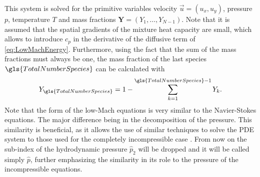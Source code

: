 This system is solved for the primitive variables velocity $\vec{u} = (u_x, u_y)$, pressure $p$, temperature $T$ and mass fractions ${\mathbf{Y} = (Y_1,\dots,Y_{N-1})}$. Note that it is assumed that the spatial gradients of the mixture heat capacity are small, which allows to introduce $c_p$ in the derivative of the diffusive term of \cref{eq:LowMachEnergy}. Furthermore, using the fact that the sum of the mass fractions must always be one, the mass fraction of the last species $\gls{TotalNumberSpecies}$ can be calculated with
\begin{align} \label{eq:MassFractionConstraint}
	Y_{\gls{TotalNumberSpecies}} = 1 - \sum_{k = 1}^{\gls{TotalNumberSpecies}-1}Y_k.
\end{align}
Note that the form of the low-Mach equations is very similar to the Navier-Stokes equations. The major difference being in the decomposition of the pressure. This similarity is beneficial, as it allows the use of similar techniques to solve the PDE system to those used for the completely incompressible case \citep{keshtibanCompressibleFlowSolvers2003}. From now on the sub-index of the hydrodynamic pressure $\hat p_2$ will be dropped and it will be called simply $\hat p$, further emphasizing the similarity in its role to the pressure of the incompressible equations.

